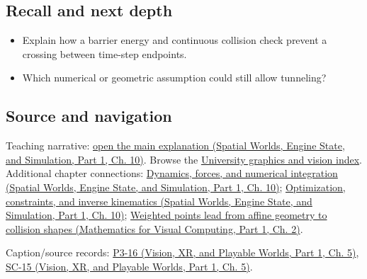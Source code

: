 \subsection{Recall and next depth}\label{appendix-a9ba01fa72a6-recall-and-next-depth}

\hypertarget{appendix-a9ba01fa72a6-recall-and-next-depth}{}

\begin{itemize}
\tightlist
\item
  Explain how a barrier energy and continuous collision check prevent a crossing between time-step endpoints.
\item
  Which numerical or geometric assumption could still allow tunneling?
\end{itemize}

\subsection{Source and navigation}\label{appendix-a9ba01fa72a6-source-and-navigation}

\hypertarget{appendix-a9ba01fa72a6-source-and-navigation}{}

Teaching narrative: \href{../05-Spatial-Worlds-Engine-State-and-Simulation-P01/main.pdf\#nameddest=04-visual-computing-ii-ch029-dynamics-forces-and-numerical-integration}{open the main explanation (Spatial Worlds, Engine State, and Simulation, Part 1, Ch. 10)}. Browse the \hyperref[appendix-a6d556a4ef50-university-graphics-vision-and-photography---independent-series]{University graphics and vision index}. Additional chapter connections: \href{../05-Spatial-Worlds-Engine-State-and-Simulation-P01/main.pdf\#nameddest=04-visual-computing-ii-ch029-dynamics-forces-and-numerical-integration}{Dynamics, forces, and numerical integration (Spatial Worlds, Engine State, and Simulation, Part 1, Ch. 10)}; \href{../05-Spatial-Worlds-Engine-State-and-Simulation-P01/main.pdf\#nameddest=04-visual-computing-ii-ch029-optimization-constraints-and-inverse-kinematics}{Optimization, constraints, and inverse kinematics (Spatial Worlds, Engine State, and Simulation, Part 1, Ch. 10)}; \href{../02-Mathematics-for-Visual-Computing-P01/main.pdf\#nameddest=01-foundations-i-ch018-weighted-points-lead-from-affine-geometry-to-collision-shapes}{Weighted points lead from affine geometry to collision shapes (Mathematics for Visual Computing, Part 1, Ch. 2)}.

Caption/source records: \href{../07-Vision-XR-and-Playable-Worlds-P01/main.pdf\#nameddest=04-visual-computing-ii-ch036-p3-16---subdivision-surfaces-part-1}{P3-16 (Vision, XR, and Playable Worlds, Part 1, Ch. 5)}, \href{../07-Vision-XR-and-Playable-Worlds-P01/main.pdf\#nameddest=04-visual-computing-ii-ch036-sc-15---stanford-cs231n-deep-learning-for-computer-vision-spring-2025-lecture-15-3d-vision}{SC-15 (Vision, XR, and Playable Worlds, Part 1, Ch. 5)}.
